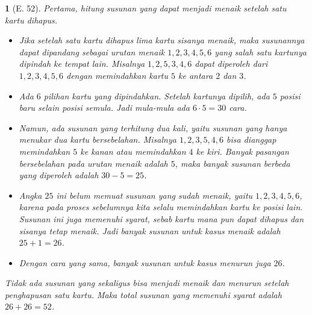 \documentclass[11pt,a4paper,DIV=12]{scrartcl}
\theoremstyle{problemstyle}
\theoremstyle{answerstyle}
\newtheorem{answer}{}
\begin{document}
\begin{answer}[E. 52]
  Pertama, hitung susunan yang dapat menjadi menaik setelah satu kartu dihapus.
  \begin{itemize}
    \item Jika setelah satu kartu dihapus lima kartu sisanya menaik, maka susunannya dapat dipandang sebagai urutan menaik $1,2,3,4,5,6$ yang salah satu kartunya dipindah ke tempat lain. Misalnya $1,2,5,3,4,6$ dapat diperoleh dari $1,2,3,4,5,6$ dengan memindahkan kartu $5$ ke antara $2$ dan $3$.
    \item Ada $6$ pilihan kartu yang dipindahkan. Setelah kartunya dipilih, ada $5$ posisi baru selain posisi semula. Jadi mula-mula ada $6 \cdot 5=30$ cara.
    \item Namun, ada susunan yang terhitung dua kali, yaitu susunan yang hanya menukar dua kartu bersebelahan. Misalnya $1,2,3,5,4,6$ bisa dianggap memindahkan $5$ ke kanan atau memindahkan $4$ ke kiri. Banyak pasangan bersebelahan pada urutan menaik adalah $5$, maka banyak susunan berbeda yang diperoleh adalah $30-5=25$.
    \item Angka $25$ ini belum memuat susunan yang sudah menaik, yaitu $1,2,3,4,5,6$, karena pada proses sebelumnya kita selalu memindahkan kartu ke posisi lain. Susunan ini juga memenuhi syarat, sebab kartu mana pun dapat dihapus dan sisanya tetap menaik. Jadi banyak susunan untuk kasus menaik adalah $25+1=26$.
    \item Dengan cara yang sama, banyak susunan untuk kasus menurun juga $26$.
  \end{itemize}
  Tidak ada susunan yang sekaligus bisa menjadi menaik dan menurun setelah penghapusan satu kartu. Maka total susunan yang memenuhi syarat adalah $26+26=\boxed{52}$.
\end{answer}
\end{document}

